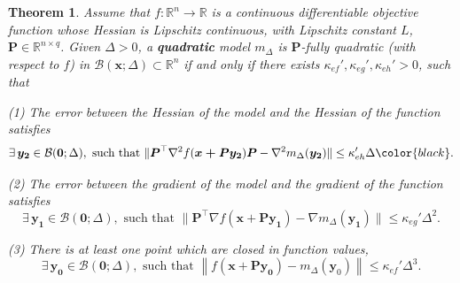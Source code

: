 \documentclass[colorlinks=true, linkcolor=blue, citecolor=blue, urlcolor=blue]{article}
\theoremstyle{plain}
\newtheorem{theorem}{Theorem}[section]
\theoremstyle{definition}
\theoremstyle{remark}
\newcommand{\RR}{\mathbb{R}}
\newcommand{\ul}{\boldsymbol}
\newcommand{\ml}{\boldsymbol}
\newcommand{\norm}[1]{\left\lVert#1\right\rVert}
\begin{document}
\begin{theorem}\label{thm:3 points->quasi-fully-quadratic}
  Assume that $f: \RR^n \rightarrow \RR$ is a continuous differentiable objective function whose Hessian is Lipschitz continuous, with Lipschitz constant $L$, $\bm P \in \RR^{n \times q}$. Given $\Delta > 0$, a \textbf{quadratic} model $m_{\Delta}$ is $\ml{P}$-fully quadratic (with respect to $f$) in $\mathcal{B}(\bm x;\Delta)\subset \RR^n$ if and only if there exists $\kappa_{ef}', \kappa_{eg}', \kappa_{eh}' > 0$, such that 

    (1) The error between the Hessian of the model and the Hessian of the function satisfies
    $$
    \exists\,  \ul{y_2} \in \mathcal{B}(\ul{0}; \Delta), \text{ such that }
    \|\ml{P}^{\top} \nabla^2 f(\ul{x + P y_2}) \ml{P} -\nabla^2 m_{\Delta}(\ul{y_2})\| \leq \kappa_{eh}' \Delta{\color{black}.}
    $$

    (2) The error between the gradient of the model and the gradient of the function satisfies
    $$
      \exists\,  \ul{y_1} \in \mathcal{B}(\ul{0}; \Delta), \text{ such that }
      \|\ml{P}^{\top} \nabla f(\ul{x + P y_1})-\nabla m_{\Delta}(\ul{y_1})\| \leq \kappa_{eg}' \Delta^2.
    $$

    (3) There is at least one point which are closed in function values,
    $$
      \exists\,  \ul{y_0} \in \mathcal{B}(\ul{0}; \Delta), \text{ such that } \norm{f(\ul{x} + \ml{P}\ul{y_0}) - m_{\Delta} (\bm y_0)} \leq \kappa_{ef}' \Delta^3.
    $$
\end{theorem}
\end{document}
